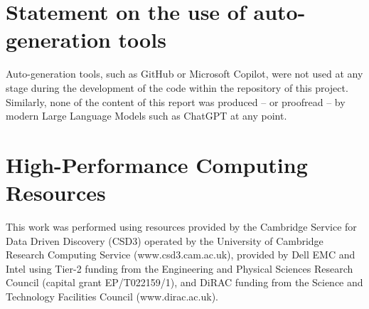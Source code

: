 \documentclass[12pt]{article}
\begin{document}


\appendix

\section{Statement on the use of auto-generation tools}

Auto-generation tools, such as GitHub or Microsoft Copilot, were not used at any stage during the development of the code within the repository of this project.
Similarly, none of the content of this report was produced -- or proofread -- by modern Large Language Models such as ChatGPT at any point.

\section {High-Performance Computing Resources}

This work was performed using resources provided by the Cambridge Service for Data Driven Discovery (CSD3) operated by the University of Cambridge Research Computing Service (www.csd3.cam.ac.uk),
provided by Dell EMC and Intel using Tier-2 funding from the Engineering and Physical Sciences Research Council (capital grant EP/T022159/1),
and DiRAC funding from the Science and Technology Facilities Council (www.dirac.ac.uk).
\end{document}
